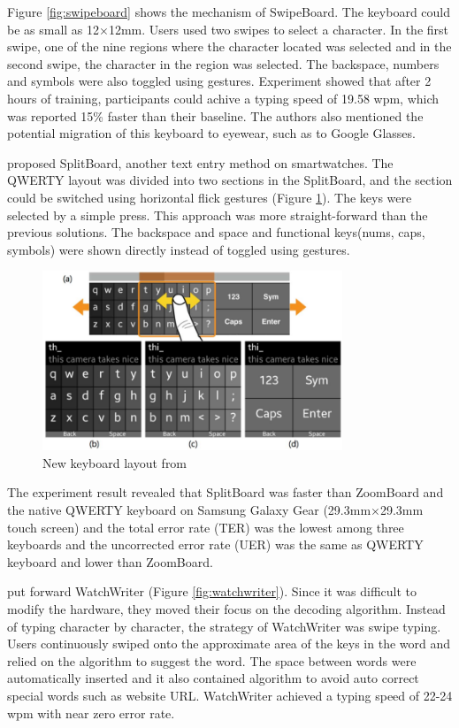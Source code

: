 \documentclass[11pt]{article}
\begin{document}
Figure \ref{fig:swipeboard} shows the mechanism of SwipeBoard. The keyboard could be as small as 12$\times$12mm. Users used two swipes to select a character. In the first swipe, one of the nine regions where the character located was selected and in the second swipe, the character in the region was selected. The backspace, numbers and symbols were also toggled using gestures. Experiment showed that after 2 hours of training, participants could achive a typing speed of 19.58 wpm, which was reported 15\% faster than their baseline. The authors also mentioned the potential migration of this keyboard to eyewear, such as to Google Glasses.

\citet{10.1145/2702123.2702273} proposed SplitBoard, another text entry method on smartwatches. The QWERTY layout was divided into two sections in the SplitBoard, and the section could be switched using horizontal flick gestures (Figure \ref{fig:splitboard}). The keys were selected by a simple press. This approach was more straight-forward than the previous solutions. The backspace and space and functional keys(nums, caps, symbols) were shown directly instead of toggled using gestures.

\begin{figure}[H]
  \centering
  \includegraphics[width=0.8\textwidth]{SplitBoard.png}
  \caption{New keyboard layout from \citep{10.1145/2702123.2702273}}
  \label{fig:splitboard}
\end{figure}

The experiment result revealed that SplitBoard was faster than ZoomBoard and the native QWERTY keyboard on Samsung Galaxy Gear (29.3mm$\times$29.3mm touch screen) and the total error rate (TER) was the lowest among three keyboards and the uncorrected error rate (UER) was the same as QWERTY keyboard and lower than ZoomBoard.

\citet{10.1145/2858036.2858242} put forward WatchWriter (Figure \ref{fig:watchwriter}). Since it was difficult to modify the hardware, they moved their focus on the decoding algorithm. Instead of typing character by character, the strategy of WatchWriter was swipe typing. Users continuously swiped onto the approximate area of the keys in the word and relied on the algorithm to suggest the word. The space between words were automatically inserted and it also contained algorithm to avoid auto correct special words such as website URL. WatchWriter achieved a typing speed of 22-24 wpm with near zero error rate.
\end{document}
